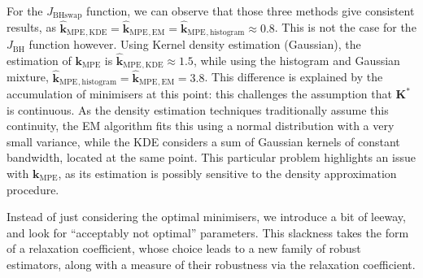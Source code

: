 \documentclass[preprint, 1p]{elsarticle}
\newcommand{\kmpe}{{\mathbf{k}}_{\mathrm{MPE}}}
\newcommand{\hatkmpe}{\hat{\mathbf{k}}_{\mathrm{MPE}}}
\newcommand{\arthur}[1]{{\itshape\color{cyan} ({#1})}}
\newcommand{\elise}[1]{{\itshape\color{red} ({#1})}}
\begin{document}
For the $J_{\mathrm{BHswap}}$ function, we can observe that those three methods give consistent results, as $\hatkmpe {}_{,\mathrm{KDE}} =\hatkmpe {}_{,\mathrm{EM}}=\hatkmpe {}_{,\mathrm{histogram}}\approx 0.8$. This is not the case for the  $J_{\mathrm{BH}}$ function however. Using Kernel density estimation (Gaussian), the estimation of $\kmpe$ is $\hatkmpe {}_{,\mathrm{KDE}} \approx 1.5$, while using the histogram and Gaussian mixture, $\hatkmpe {}_{,\mathrm{histogram}}=\hatkmpe {}_{,\mathrm{EM}}=3.8$.
This difference is explained by the accumulation of minimisers at this point: this challenges the assumption that $\mathbf{K}^*$ is continuous. As the density estimation techniques traditionally assume this continuity, the EM algorithm fits this using a normal distribution with a very small variance, while the KDE considers a sum of Gaussian kernels of constant bandwidth, located at the same point. This particular problem highlights an issue with $\kmpe$, as its estimation is possibly sensitive to the density approximation procedure.



Instead of just considering the optimal minimisers, we introduce a bit of leeway, and look for ``acceptably not optimal'' parameters.
 This slackness takes the form of a relaxation coefficient, whose choice leads to a new family of robust estimators, along with a measure of their robustness via the relaxation coefficient.


\end{document}
